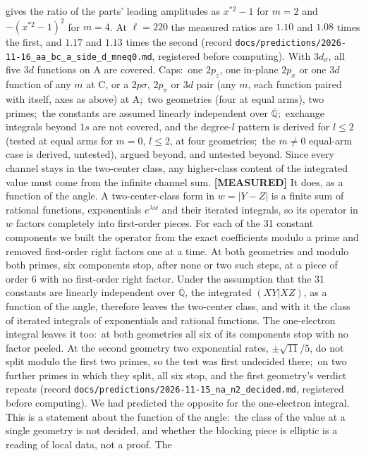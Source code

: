 \documentclass[aps,pra,twocolumn,superscriptaddress,longbibliography]{revtex4-2}
\begin{document}
gives the ratio of the parts'
leading amplitudes as $x^{*2}-1$ for $m=2$ and $-(x^{*2}-1)^2$ for $m=4$.  At $\ell=220$ the
measured ratios are $1.10$ and $1.08$ times the first, and $1.17$ and $1.13$ times the second
(record \texttt{docs/predictions/2026-11-16\_aa\_bc\_a\_side\_d\_mneq0.md}, registered before
computing).  With $3d_\sigma$, all five $3d$ functions on A are covered.
Caps:\
one $2p_z$, one in-plane $2p_x$ or one $3d$ function of any $m$ at C, or a $2p\sigma$, $2p_\pi$ or
$3d$ pair (any $m$, each function paired with itself, axes as above) at A;\ two
geometries (four at equal arms), two primes;\ the constants are assumed linearly independent over
$\overline{\mathbb{Q}}$;\ exchange
integrals beyond $1s$ are not covered, and the degree-$l$ pattern is derived for $l\le2$
(tested at equal arms for $m=0$, $l\le2$, at four geometries;\ the $m\neq0$ equal-arm case is
derived, untested), argued beyond, and untested beyond.
Since every channel stays in the two-center class, any higher-class content of the integrated
value must come from the infinite channel sum.  \textbf{[MEASURED]} It does, as a function of the
angle.  A two-center-class form in $w=|Y-Z|$ is a finite sum of rational functions, exponentials
$e^{\lambda w}$ and their iterated integrals, so its operator in $w$ factors completely into
first-order pieces.  For each of the 31 constant components we built the operator from the exact
coefficients modulo a prime and removed first-order right factors one at a time.  At both
geometries and modulo both primes, six components stop, after none or two such steps, at a piece
of order $6$ with no first-order right factor.  Under the assumption that the 31 constants are
linearly independent over $\overline{\mathbb{Q}}$, the integrated $(XY|XZ)$, as a function of the
angle, therefore leaves the two-center class, and with it the class of iterated integrals of
exponentials and rational functions.  The one-electron integral leaves it too:\ at both geometries
all six of its components stop with no factor peeled.  At the second geometry two exponential rates,
$\pm\sqrt{11}/5$, do not split modulo the first two primes, so the test was first undecided there;\ on
two further primes in which they split, all six stop, and the first geometry's verdict repeats
(record \texttt{docs/predictions/2026-11-15\_na\_n2\_decided.md}, registered before computing).  We had
predicted the opposite for the one-electron integral.  This is a
statement about the function of the angle:\ the class of the value at a single geometry is not
decided, and whether the blocking piece is elliptic is a reading of local data, not a proof.  The
\end{document}
